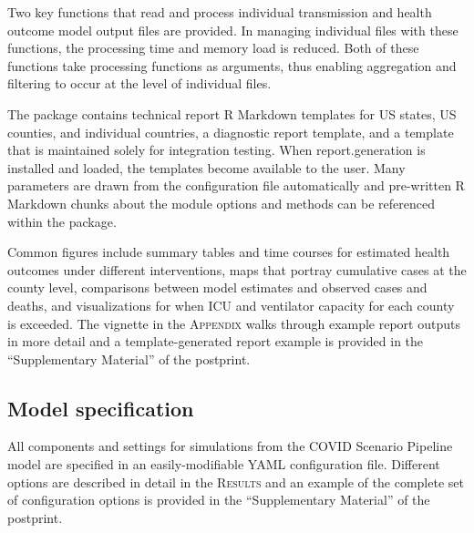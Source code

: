 {Two key functions that read and process individual transmission and health outcome model output files are provided. In managing individual files with these functions, the processing time and memory load is reduced. Both of these functions take processing functions as arguments, thus enabling aggregation and filtering to occur at the level of individual files.

The package contains technical report R Markdown templates for US states, US counties, and individual countries, a diagnostic report template, and a template that is maintained solely for integration testing. When report.generation is installed and loaded, the templates become available to the user. Many parameters are drawn from the configuration file automatically and pre-written R Markdown chunks about the module options and methods can be referenced within the package.

Common figures include summary tables and time courses for estimated health outcomes under different interventions, maps that portray cumulative cases at the county level, comparisons between model estimates and observed cases and deaths, and visualizations for when ICU and ventilator capacity for each county is exceeded. The vignette in the \textsc{Appendix} walks through example report outputs in more detail and a template-generated report example is provided in the “Supplementary Material” of the postprint.

\subsection{Model specification}
All components and settings for simulations from the COVID Scenario Pipeline model are specified in an easily-modifiable YAML configuration file. Different options are described in detail in the \textsc{Results} and an example of the complete set of configuration options is provided in the “Supplementary Material” of the postprint.


}
